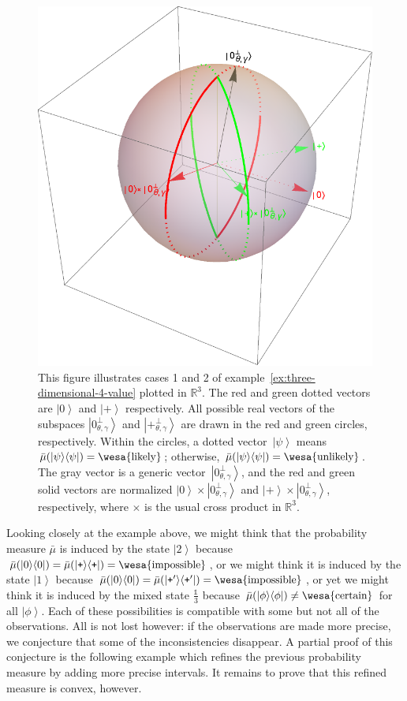 \documentclass{article}
\theoremstyle{remark}
\newcommand{\imposs}{{\mbox{\wesa{impossible}}}}
\newcommand{\likely}{{\mbox{\wesa{likely}}}}
\newcommand{\unlikely}{{\mbox{\wesa{unlikely}}}}
\newcommand{\necess}{{\mbox{\wesa{certain}}}}
\newcommand{\ket}[1]{{\left\vert{#1}\right\rangle}}
\newcommand{\op}[2]{\ensuremath{\left\vert{#1}\middle\rangle\middle\langle{#2}\right\vert}}
\newcommand{\proj}[1]{\op{#1}{#1}}
\newcommand{\ps}{\texttt{+}}
\begin{document}
\begin{figure}
\begin{center}
\includegraphics[scale=0.38]{measure4.pdf}
\end{center}
\caption{\label{fig:three-dimensional-4-value}This figure illustrates
  cases 1 and 2 of example~\ref{ex:three-dimensional-4-value} plotted
  in $\mathbb{R}^{3}$. The red and green dotted vectors are $\ket{0}$
  and $\ket{\ps}$ respectively.  All possible real vectors of the subspaces
  $\ket{0_{\theta,\gamma}^{\perp}}$ and
  $\ket{\ps_{\theta,\gamma}^{\perp}}$ are drawn in the red and green
  circles, respectively. Within the circles, a dotted
  vector~$\ket{\psi}$ means $\bar{\mu}(\proj{\psi})=\likely$;
  otherwise, $\bar{\mu}(\proj{\psi})=\unlikely$. The gray vector is a
  generic vector~$\ket{0_{\theta,\gamma}^{\perp}}$, and the red and
  green solid vectors are normalized
  $\ket{0}\times\ket{0_{\theta,\gamma}^{\perp}}$ and
  $\ket{\ps}\times\ket{0_{\theta,\gamma}^{\perp}}$, respectively, where
  $\times$ is the usual cross product in $\mathbb{R}^{3}$.}
\end{figure}

Looking closely at the example above, we might think that the
probability measure $\bar{\mu}$ is induced by the state $\ket{2}$
because $\bar{\mu}(\proj{0})=\bar{\mu}(\proj{\ps})=\imposs$, or we
might think it is induced by the state $\ket{1}$ because
$\bar{\mu}(\proj{0})=\bar{\mu}(\proj{\ps'})=\imposs$, or yet we might
think it is induced by the mixed state $\frac{\mathbb{1}}{3}$ because
$\bar{\mu}(\proj{\phi})\ne\necess$ for all $\ket{\phi}$. Each of these
possibilities is compatible with some but not all of the
observations. All is not lost however: if the observations are made
more precise, we conjecture that some of the inconsistencies
disappear. A partial proof of this conjecture is the following example
which refines the previous probability measure by adding more precise
intervals. It remains to prove that this refined measure is convex,
however. 
\end{document}
